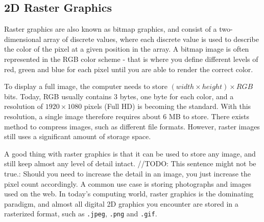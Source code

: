 \subsection{2D Raster Graphics}
Raster graphics are also known as bitmap graphics, and consist of a two-dimensional array of discrete values, where each discrete value is used to describe the color of the pixel at a given position in the array.
A bitmap image is often represented in the RGB color scheme - that is where you define different levels of red, green and blue for each pixel until you are able to render the correct color.

To display a full image, the computer needs to store \( (width \times height) \times RGB \) bits.
Today, RGB usually contains 3 bytes, one byte for each color, and a resolution of \(1920 \times 1080\) pixels (Full HD) is becoming the standard.
With this resolution, a single image therefore requires about 6 MB to store.
There exists method to compress images, such as different file formats. 
However, raster images still uses a significant amount of storage space.

A good thing with raster graphics is that it can be used to store any image, and still keep almost any level of detail intact. 
//TODO: This sentence might not be true.: Should you need to increase the detail in an image, you just increase the pixel count accordingly. 
A common use case is storing photographs and images used on the web. 
In today's computing world, raster graphics is the dominating paradigm, and almost all digital 2D graphics you encounter are stored in a rasterized format, such as \texttt{.jpeg}, \texttt{.png} and \texttt{.gif}.
